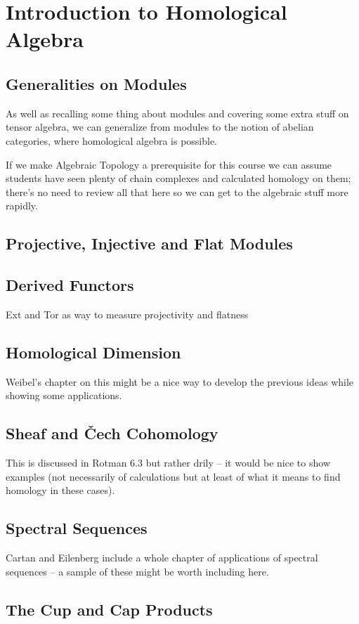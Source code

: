 \documentclass[oneside,english]{amsbook}
\numberwithin{section}{chapter}
\theoremstyle{plain}
\theoremstyle{definition}
\providecommand{\Cech}{\v{C}ech }
\begin{document}
	\part{Introduction to Homological Algebra}
	
	\chapter{Generalities on Modules}
	
	As well as recalling some thing about modules and covering some extra stuff on tensor algebra, we can generalize from modules to the notion of abelian categories, where homological algebra is possible.
	
	If we make Algebraic Topology a prerequisite for this course we can assume students have seen plenty of chain complexes and calculated homology on them; there's no need to review all that here so we can get to the algebraic stuff more rapidly.
	
	\chapter{Projective, Injective and Flat Modules}
	
	\chapter{Derived Functors}
	
	Ext and Tor as way to measure projectivity and flatness
	
	\chapter{Homological Dimension}
	
	Weibel's chapter on this might be a nice way to develop the previous ideas while showing some applications.
	
	\chapter{Sheaf and \Cech Cohomology}
	
	This is discussed in Rotman 6.3 but rather drily -- it would be nice to show examples (not necessarily of calculations but at least of what it means to find homology in these cases).

	\chapter{Spectral Sequences}
	
	Cartan and Eilenberg include a whole chapter of applications of spectral sequences -- a sample of these might be worth including here.

	\chapter{The Cup and Cap Products}
\end{document}
